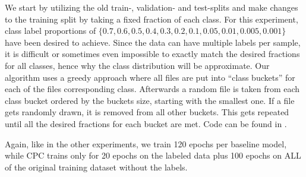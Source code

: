 We start by utilizing the old train-, validation- and test-splits and make changes to the training split by taking a fixed fraction of each class. For this experiment, class label proportions of $\{0.7, 0.6, 0.5, 0.4, 0.3, 0.2, 0.1, 0.05, 0.01, 0.005, 0.001\}$ have been desired to achieve. Since the data can have multiple labels per sample, it is difficult or sometimes even impossible to exactly match the desired fractions for all classes, hence why the class distribution will be approximate. Our algorithm uses a greedy approach where all files are put into \enquote{class buckets} for each of the files corresponding class. Afterwards a random file is taken from each class bucket ordered by the buckets size, starting with the smallest one. If a file gets randomly drawn, it is removed from all other buckets. This gets repeated until all the desired fractions for each bucket are met. Code can be found in .


Again, like in the other experiments, we train 120 epochs per baseline model, while CPC trains only for 20 epochs on the labeled data plus 100 epochs on ALL of the original training dataset without the labels.

